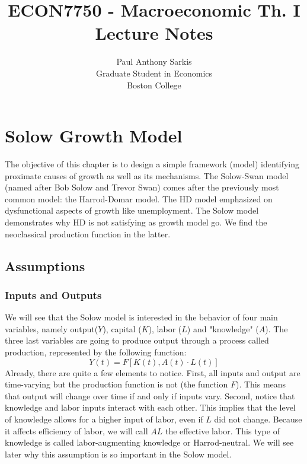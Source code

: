 \documentclass[12pt]{report}
\begin{document}
\date{}
\title{ECON7750 - Macroeconomic Th. I\\ Lecture Notes}
\author{Paul Anthony Sarkis\\ Graduate Student in Economics \\Boston College} 
 
\maketitle

\tableofcontents


\chapter{Solow Growth Model}

The objective of this chapter is to design a simple framework (model) identifying proximate causes of growth as well as its mechanisms. The Solow-Swan model (named after Bob Solow and Trevor Swan) comes after the previously most common model: the Harrod-Domar model. The HD model emphasized on dysfunctional aspects of growth like unemployment. The Solow model demonstrates why HD is not satisfying as growth model go. We find the neoclassical production function in the latter.

\section{Assumptions}

\subsection{Inputs and Outputs}

We will see that the Solow model is interested in the behavior of four main variables, namely output($Y$), capital ($K$), labor ($L$) and "knowledge" ($A$). The three last variables are going to produce output through a process called production, represented by the following function: $$Y(t) = F[K(t), A(t)\cdot L(t)] $$ Already, there are quite a few elements to notice. First, all inputs and output are time-varying but the production function is not (the function $F$). This means that output will change over time if and only if inputs vary. Second, notice that knowledge and labor inputs interact with each other. This implies that the level of knowledge allows for a higher input of labor, even if $L$ did not change. Because it affects efficiency of labor, we will call $AL$ the effective labor. This type of knowledge is called labor-augmenting knowledge or Harrod-neutral. We will see later why this assumption is so important in the Solow model.
\end{document}
